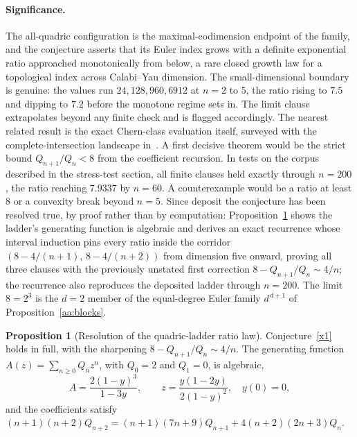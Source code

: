 \documentclass[11pt]{article}
\theoremstyle{definition}
\newtheorem{proposition}{Proposition}
\begin{document}
\paragraph{Significance.}
The all-quadric configuration is the maximal-codimension endpoint of the family, and the conjecture asserts that its Euler index grows with a definite exponential ratio approached monotonically from below, a rare closed growth law for a topological index across Calabi--Yau dimension.  The small-dimensional boundary is genuine: the values run $24,128,960,6912$ at $n=2$ to $5$, the ratio rising to $7.5$ and dipping to $7.2$ before the monotone regime sets in.  The limit clause extrapolates beyond any finite check and is flagged accordingly.  The nearest related result is the exact Chern-class evaluation itself, surveyed with the complete-intersection landscape in~\cite{He21}.  A first decisive theorem would be the strict bound $Q_{n+1}/Q_n<8$ from the coefficient recursion.  In tests on the corpus described in the stress-test section, all finite clauses held exactly through $n=200$, the ratio reaching $7.9337$ by $n=60$.  A counterexample would be a ratio at least $8$ or a convexity break beyond $n=5$.  Since deposit the conjecture has been resolved true, by proof rather than by computation: Proposition~\ref{x:qladder} shows the ladder's generating function is algebraic and derives an exact recurrence whose interval induction pins every ratio inside the corridor $(8-4/(n+1),\,8-4/(n+2))$ from dimension five onward, proving all three clauses with the previously unstated first correction $8-Q_{n+1}/Q_n\sim4/n$; the recurrence also reproduces the deposited ladder through $n=200$.  The limit $8=2^3$ is the $d=2$ member of the equal-degree Euler family $d^{\,d+1}$ of Proposition~\ref{aa:blocks}.

\begin{proposition}[Resolution of the quadric-ladder ratio law]\label{x:qladder}
Conjecture~\ref{x1} holds in full, with the sharpening $8-Q_{n+1}/Q_n\sim4/n$.  The generating function $A(z)=\sum_{n\ge0}Q_nz^n$, with $Q_0=2$ and $Q_1=0$, is algebraic,
\[
A=\frac{2(1-y)^3}{1-3y},\qquad z=\frac{y(1-2y)}{2(1-y)^2},\quad y(0)=0,
\]
and the coefficients satisfy $(n+1)(n+2)Q_{n+2}=(n+1)(7n+9)Q_{n+1}+4(n+2)(2n+3)Q_n$.
\end{proposition}
\end{document}
